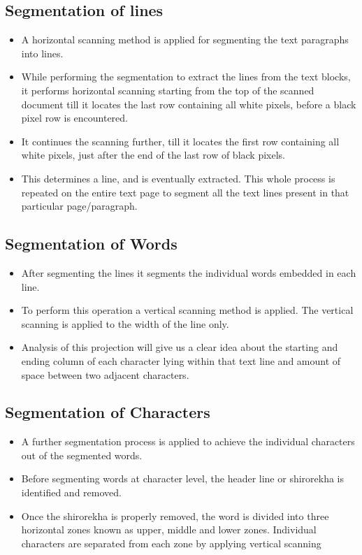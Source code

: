 \subsection{Segmentation of lines}
\begin{itemize}
\item A horizontal scanning method is applied for segmenting the text paragraphs into lines. 
\item While performing the segmentation to extract the lines from the text blocks, it performs horizontal scanning starting from the top of the scanned document till it locates the last row containing all white pixels, before a black pixel row is encountered. 
\item It continues the scanning further, till it locates the first row containing all white pixels, just after the end of the last row of black pixels. 
\item This determines a line, and is eventually extracted. This whole process is repeated on the entire text page to segment all the text lines present in that particular page/paragraph.
\end{itemize}

\subsection{Segmentation of Words}
\begin{itemize}
\item After segmenting the lines it segments the individual words embedded in each line.
\item To perform this operation a vertical scanning method is applied. The vertical scanning is applied to the width of the line only. 
\item Analysis of this projection will give us a clear idea about the starting and ending column of each character lying within that text line and amount of space between two adjacent characters.
\end{itemize}

\subsection{Segmentation of Characters}
\begin{itemize}
\item A further segmentation process is applied to achieve the individual characters out of the segmented words. 
\item Before segmenting words at character level, the header line or shirorekha is identified and removed. 
\item Once the shirorekha is properly removed, the word is divided into three horizontal zones known as upper, middle and lower zones. Individual characters are separated from each zone by applying vertical scanning
\end{itemize}


